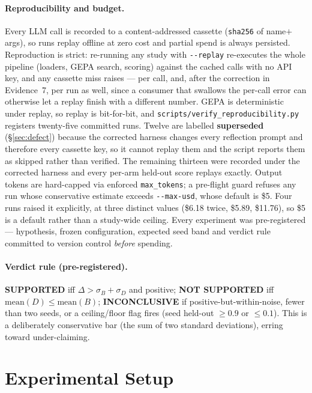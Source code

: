 \documentclass[11pt]{article}
\newcommand{\dd}{\ensuremath{\Delta}}
\begin{document}
\paragraph{Reproducibility and budget.}
Every LLM call is recorded to a content-addressed cassette (\texttt{sha256} of name$+$args), so
runs replay offline at zero cost and partial spend is always persisted. Reproduction is strict:
re-running any study with \texttt{-{}-replay} re-executes the whole pipeline (loaders, GEPA search,
scoring) against the cached calls with no API key, and any cassette miss raises --- per call, and,
after the correction in Evidence~7, per run as well, since a consumer that swallows the per-call
error can otherwise let a replay finish with a different number. GEPA is deterministic under
replay, so replay is bit-for-bit, and \texttt{scripts/verify\_reproducibility.py}
registers twenty-five committed runs. Twelve are labelled \textbf{superseded} (\S\ref{sec:defect}) because
the corrected harness changes every reflection prompt and therefore every cassette key, so it
cannot replay them and the script reports them as skipped rather than verified.
The remaining thirteen were recorded under the corrected harness and every per-arm held-out score replays
exactly. Output tokens are hard-capped via enforced \texttt{max\_tokens}; a pre-flight guard
refuses any run whose conservative estimate exceeds \texttt{-{}-max-usd}, whose default is \$5.
Four runs raised it explicitly, at three distinct values (\$6.18 twice, \$5.89, \$11.76), so \$5 is
a default rather than a study-wide ceiling. Every experiment was pre-registered --- hypothesis,
frozen configuration, expected seed band and verdict rule committed to version control
\emph{before} spending.

\paragraph{Verdict rule (pre-registered).}
\textbf{SUPPORTED} iff $\dd > \sigma_B + \sigma_D$ and positive;
\textbf{NOT SUPPORTED} iff $\mathrm{mean}(D) \le \mathrm{mean}(B)$;
\textbf{INCONCLUSIVE} if positive-but-within-noise, fewer than two seeds, or a
ceiling/floor flag fires (seed held-out $\ge 0.9$ or $\le 0.1$). This is a
deliberately conservative bar (the sum of two standard deviations), erring
toward under-claiming.

\section{Experimental Setup}
\label{sec:setup}
\end{document}
